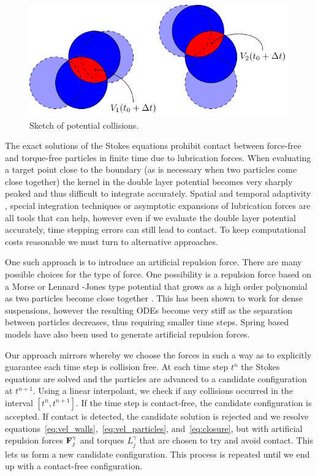 \documentclass[preprint, 10pt]{elsarticle}
\begin{document}
\begin{figure}[!h]\label{fig:collision_sketch}
\begin{center}
\includegraphics{figures/collisions.pdf}
\end{center}
\caption{Sketch of potential collisions.}
\end{figure}
The exact solutions of the Stokes equations prohibit contact between
force-free and torque-free particles in finite time due to lubrication
forces. When evaluating a target point close to the boundary (as is necessary when two particles come close together) the kernel in the double layer potential becomes very sharply peaked and thus difficult to integrate accurately. Spatial and temporal adaptivity \cite{Kropinski1999}, special integration techniques \cite{Klockner2013, Ying2006} or asymptotic expansions of lubrication forces \cite{Mammoli2006} are all tools that can help, however even if we evaluate the double layer potential accurately, time stepping errors can still lead to contact. To keep computational costs reasonable we must turn to alternative approaches. 

One such approach is to introduce an artificial repulsion force. There
are many possible choices for the type of force. One possibility is a repulsion force based on a Morse or 
Lennard -Jones type potential that grows as a high order polynomial as two particles become close together \cite{Flormann2017, Liu2006}. This has been shown to work for dense
suspensions, however the resulting ODEs become very stiff as the
separation between particles decreases, thus requiring smaller time
steps. Spring based models \cite{Tsubota2006, Zhao2013, Kabacogulu2017} have also been used to generate artificial repulsion forces.

Our approach mirrors \cite{Lu2017} whereby we choose the forces in such a way as to
explicitly guarantee each time step is collision free.  At each time
step $t^n$ the Stokes equations are solved and the particles are
advanced to a candidate configuration at $t^{n+1}$.  Using a linear
interpolant, we check if any collisions occurred in the interval
$[t^n,t^{n+1}]$.  If the time step is contact-free, the candidate
configuration is accepted.  If contact is detected, the candidate
solution is rejected and we resolve
equations~\eqref{eq:vel_walls},~\eqref{eq:vel_particles},
and~\eqref{eq:closure}, but with artificial repulsion forces ${\mathbf{F}}^\gamma_j$ and torques
$L^\gamma_j$ that are chosen to try and avoid contact.  This lets us form a new candidate configuration. This process is repeated until we end up with a contact-free configuration.
\end{document}

